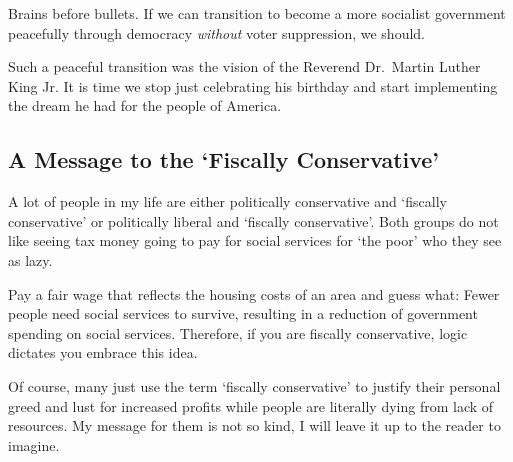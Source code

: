 Brains before bullets. If we can transition to become a more socialist government peacefully through democracy \emph{without} voter suppression, we should.

Such a peaceful transition was the vision of the Reverend Dr.\ Martin Luther King Jr. It is time we stop just celebrating his birthday and start implementing the dream he had for the people of America.

\subsection{A Message to the \texorpdfstring{`Fiscally Conservative'}{'Fiscally Conservative'}}

A lot of people in my life are either politically conservative and `fiscally conservative' or politically liberal and `fiscally conservative'. Both groups do not like seeing tax money going to pay for social services for `the poor' who they see as lazy.

Pay a fair wage that reflects the housing costs of an area and guess what: Fewer people need social services to survive, resulting in a reduction of government spending on social services. Therefore, if you are fiscally conservative, logic dictates you embrace this idea.

Of course, many just use the term `fiscally conservative' to justify their personal greed and lust for increased profits while people are literally dying from lack of resources. My message for them is not so kind, I will leave it up to the reader to imagine.
